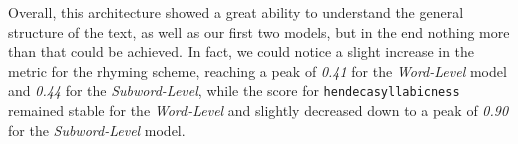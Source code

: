 Overall, this architecture showed a great ability to understand the general structure of the text, as well as our first two models, but in the end nothing more than that could be achieved.
In fact, we could notice a slight increase in the metric for the rhyming scheme, reaching a peak of \textit{0.41} for the \textit{Word-Level} model and \textit{0.44} for the \textit{Subword-Level}, while the score for \texttt{hendecasyllabicness} remained stable for the \textit{Word-Level} and slightly decreased down to a peak of \textit{0.90} for the \textit{Subword-Level} model.